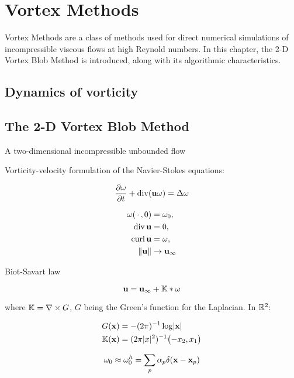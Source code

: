 \chapter{Vortex Methods}
\label{ch:vm}

Vortex Methods are a class of methods
used for direct numerical simulations
of incompressible viscous flows at high Reynold numbers.
In this chapter, the 2-D Vortex Blob Method is introduced,
along with its algorithmic characteristics.

\section{Dynamics of vorticity}

\section{The 2-D Vortex Blob Method}

A two-dimensional incompressible unbounded flow


Vorticity-velocity formulation of the Navier-Stokes equations:

\begin{equation}
  \label{eq:vort-vel-navier-stokes}
  \frac{\partial\omega}{\partial t} + \operatorname{div}(\mathbf u\omega) = \Delta\omega
\end{equation}

\begin{align}
  \omega(\,\cdot\,{}, 0) &= \omega_0, \\
  \operatorname{div}\mathbf u &= 0, \\
  \operatorname{curl}\mathbf u &= \omega, \\
  \lVert\mathbf u\rVert &\to\mathbf u_\infty
\end{align}

Biot-Savart law

\begin{equation}
  \label{eq:biot-savart-law}
  \mathbf u = \mathbf u_\infty + \mathbb{K} * \omega
\end{equation}

where \(\mathbb{K} = \nabla\times G\),
\(G\) being the Green's function for the Laplacian.
In \(\mathbb{R}^2\):

\begin{align}
  G(\mathbf x) &= -(2\pi)^{-1} \log\lvert\mathbf x\rvert \\
  \mathbb{K}(\mathbf x) &= (2\pi\lvert x\rvert^2)^{-1} \bigl(-x_2, x_1\bigr) 
\end{align}

\begin{equation}
  \label{eq:initial-vorticity-approximation}
  \omega_0\approx\omega_0^h = \sum_p\alpha_p\delta(\mathbf x - \mathbf x_p)
\end{equation}

